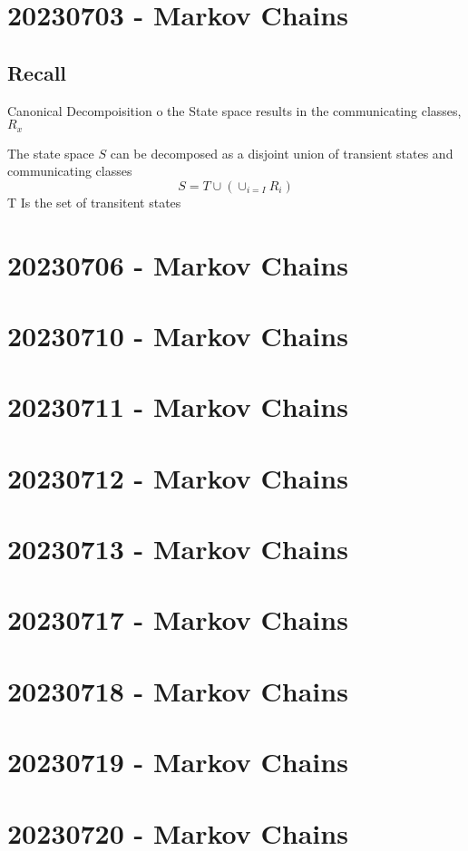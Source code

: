 \documentclass{report}
\begin{document}
  

\chapter{20230703 - Markov Chains}%
  \section{Recall}%
    Canonical Decompoisition o the State space results in the communicating classes, $R_x$

      The state space $S$ can be decomposed as a disjoint union of
      transient states and communicating classes
      \[ S = T \cup \left( \cup_{i=I} R_i \right) \]
      T Is the set of transitent states
  
    
\chapter{20230706 - Markov Chains}%
\chapter{20230710 - Markov Chains}%
\chapter{20230711 - Markov Chains}%
\chapter{20230712 - Markov Chains}%
\chapter{20230713 - Markov Chains}%
\chapter{20230717 - Markov Chains}%
\chapter{20230718 - Markov Chains}%
\chapter{20230719 - Markov Chains}%
\chapter{20230720 - Markov Chains}%
\end{document}
